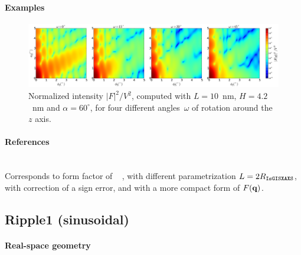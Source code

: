 \paragraph{Examples}\strut

\begin{figure}[H]
\begin{center}
\includegraphics[width=\textwidth]{fig/ff2/ff_pyramid.pdf}
\end{center}
\caption{Normalized intensity $|F|^2/V^2$,
computed with $L=10$~nm, $H=4.2$~nm and $\alpha=60^{\circ}$,
for four different angles~$\omega$ of rotation around the $z$ axis.}
\end{figure}

\paragraph{References}\strut\\
Corresponds to  form factor of \IsGISAXS\
\cite[Eq.~2.31]{Laz08} \cite[Eq.~221]{ReLL09},
with different parametrization $L=2R_{\rm{\texttt{IsGISXAXS}}}$,
with correction of a sign error,
and with a more compact form of $F(\mathbf{q})$.

\clearpage
\subsection{Ripple1 (sinusoidal)} \label{sec:Ripple1}  

\paragraph{Real-space geometry}\strut\\

